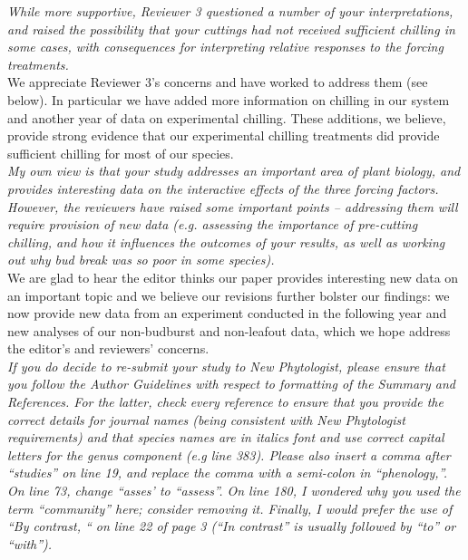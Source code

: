 \documentclass[11pt,a4paper]{article}
\begin{document}
\emph{While more supportive, Reviewer 3 questioned a number of your interpretations, and raised the
possibility that your cuttings had not received sufficient chilling in some cases, with
consequences for interpreting relative responses to the forcing treatments.}\\

We appreciate Reviewer 3's concerns and have worked to address them (see below). In particular we have added more information on chilling in our system and another year of data on experimental chilling. These additions, we believe, provide strong evidence that our experimental chilling treatments did provide sufficient chilling for most of our species. \\

\emph{My own view is that your study addresses an important area of plant biology, and provides
interesting data on the interactive effects of the three forcing factors.  However, the
reviewers have raised some important points – addressing them will require provision of new
data (e.g. assessing the importance of pre-cutting chilling, and how it influences the
outcomes of your results, as well as working out why bud break was so poor in some species).}\\

We are glad to hear the editor thinks our paper provides interesting new data on an important topic and we believe our revisions further bolster our findings: we now provide new data from an experiment conducted in the following year and new analyses of our non-budburst and non-leafout data, which we hope address the editor's and reviewers' concerns. \\

\emph{If you do decide to re-submit your study to New Phytologist, please ensure that you follow
the Author Guidelines with respect to formatting of the Summary and References.  For the
latter, check every reference to ensure that you provide the correct details for journal
names (being consistent with New Phytologist requirements) and that species names are in
italics font and use correct capital letters for the genus component (e.g line 383).  Please
also insert a comma after “studies” on line 19, and replace the comma with a semi-colon in
“phenology,”.  On line 73, change “asses’ to “assess”. On line 180, I wondered why you used
the term “community” here; consider removing it.  Finally, I would prefer the use of “By
contrast, “ on line 22 of page 3 (“In contrast” is usually followed by “to” or “with”).}\\
\end{document}
